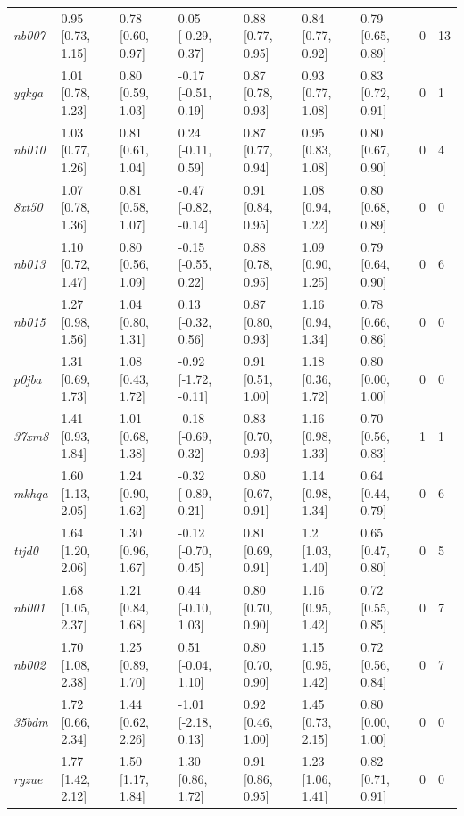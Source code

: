 \documentclass[9pt,lineno,final]{elife}
\begin{document}
\begin{table}[tb!]
\begin{center}
\begin{threeparttable}
\begin{tabular}{@{}lllllllll@{}}
\textit{nb007} & 0.95 [0.73, 1.15] & 0.78 [0.60, 0.97] & 0.05 [-0.29, 0.37] & 0.88 [0.77, 0.95] & 0.84 [0.77, 0.92] & 0.79 [0.65, 0.89] & 0 & 13 \\
\textit{yqkga} & 1.01 [0.78, 1.23] & 0.80 [0.59, 1.03] & -0.17 [-0.51, 0.19] & 0.87 [0.78, 0.93] & 0.93 [0.77, 1.08] & 0.83 [0.72, 0.91] & 0 & 1 \\
\textit{nb010} & 1.03 [0.77, 1.26] & 0.81 [0.61, 1.04] & 0.24 [-0.11, 0.59] & 0.87 [0.77, 0.94] & 0.95 [0.83, 1.08] & 0.80 [0.67, 0.90] & 0 & 4 \\
\textit{8xt50} & 1.07 [0.78, 1.36] & 0.81 [0.58, 1.07] & -0.47 [-0.82, -0.14] & 0.91 [0.84, 0.95] & 1.08 [0.94, 1.22] & 0.80 [0.68, 0.89] & 0 & 0 \\
\textit{nb013} & 1.10 [0.72, 1.47] & 0.80 [0.56, 1.09] & -0.15 [-0.55, 0.22] & 0.88 [0.78, 0.95] & 1.09 [0.90, 1.25] & 0.79 [0.64, 0.90] & 0 & 6 \\
\textit{nb015} & 1.27 [0.98, 1.56] & 1.04 [0.80, 1.31] & 0.13 [-0.32, 0.56] & 0.87 [0.80, 0.93] & 1.16 [0.94, 1.34] & 0.78 [0.66, 0.86] & 0 & 0 \\
\textit{p0jba} & 1.31 [0.69, 1.73] & 1.08 [0.43, 1.72] & -0.92 [-1.72, -0.11] & 0.91 [0.51, 1.00] & 1.18 [0.36, 1.72] & 0.80 [0.00, 1.00] & 0 & 0 \\
\textit{37xm8} & 1.41 [0.93, 1.84] & 1.01 [0.68, 1.38] & -0.18 [-0.69, 0.32] & 0.83 [0.70, 0.93] & 1.16 [0.98, 1.33] & 0.70 [0.56, 0.83] & 1 & 1 \\
\textit{mkhqa} & 1.60 [1.13, 2.05] & 1.24 [0.90, 1.62] & -0.32 [-0.89, 0.21] & 0.80 [0.67, 0.91] & 1.14 [0.98, 1.34] & 0.64 [0.44, 0.79] & 0 & 6 \\
\textit{ttjd0} & 1.64 [1.20, 2.06] & 1.30 [0.96, 1.67] & -0.12 [-0.70, 0.45] & 0.81 [0.69, 0.91] & 1.2 [1.03, 1.40] & 0.65 [0.47, 0.80] & 0 & 5 \\
\textit{nb001} & 1.68 [1.05, 2.37] & 1.21 [0.84, 1.68] & 0.44 [-0.10, 1.03] & 0.80 [0.70, 0.90] & 1.16 [0.95, 1.42] & 0.72 [0.55, 0.85] & 0 & 7 \\
\textit{nb002} & 1.70 [1.08, 2.38] & 1.25 [0.89, 1.70] & 0.51 [-0.04, 1.10] & 0.80 [0.70, 0.90] & 1.15 [0.95, 1.42] & 0.72 [0.56, 0.84] & 0 & 7 \\
\textit{35bdm} & 1.72 [0.66, 2.34] & 1.44 [0.62, 2.26] & -1.01 [-2.18, 0.13] & 0.92 [0.46, 1.00] & 1.45 [0.73, 2.15] & 0.80 [0.00, 1.00] & 0 & 0 \\
\textit{ryzue} & 1.77 [1.42, 2.12] & 1.50 [1.17, 1.84] & 1.30 [0.86, 1.72] & 0.91 [0.86, 0.95] & 1.23 [1.06, 1.41] & 0.82 [0.71, 0.91] & 0 & 0 \\

\end{tabular}
\end{threeparttable}
\end{center}
\end{table}
\end{document}
